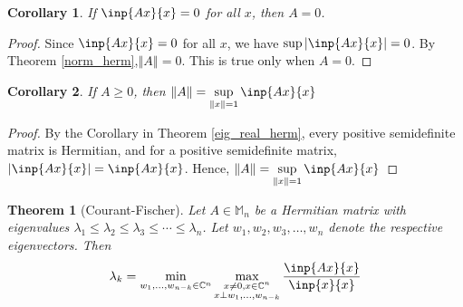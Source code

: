 \documentclass[twofold]{article}
\newcommand*\norm[1]{\left \Vert #1 \right\Vert}
\newcommand*\abs[1]{\left \vert #1 \right\vert}
\theoremstyle{plain}
\newtheorem{theorem}{Theorem}
\newtheorem*{corollary}{Corollary}
\theoremstyle{definition}
\theoremstyle{remark}
\begin{document}
\begin{corollary} If \(\inp{Ax}{x} = 0\) for all \(x\), then \(A = 0\).\end{corollary}
\begin{proof} Since \(\inp{Ax}{x} = 0\) for all \(x\), we have \(\sup \abs{\inp{Ax}{x}} = 0\). By Theorem \ref{norm_herm},\( \norm{A} = 0 \). This is true only when \(A = 0\).\end{proof}


\begin{corollary} If \(A \ge 0\), then \(\displaystyle \norm{A} = \sup _{\norm{x} = 1} \inp{Ax}{x}\) \end{corollary}
\begin{proof}   By the Corollary in Theorem \ref{eig_real_herm}, every positive semidefinite matrix is Hermitian, and for a positive semidefinite matrix, \(\abs{\inp{Ax}{x}} = \inp{Ax}{x}\). Hence, \(\norm{A} = \displaystyle \sup_{\norm{x} = 1} \inp{Ax}{x}\) \end{proof}



\begin{theorem}[Courant-Fischer] Let \(A \in \mathbb{M}_n\) be a Hermitian matrix with eigenvalues \(\lambda_1 \le \lambda_2 \le \lambda_3 \le \cdots \le \lambda_n\). Let \(w_1, w_2, w_3, \ldots , w_n\) denote the respective eigenvectors.  Then 
  \[ \lambda_k = \min_{w_1, \ldots , w_{n-k} \in \mathbb{C}^n} \max_{\substack{x \neq 0, x\in \mathbb{C}^n \\ x \perp w_1, \ldots , w_{n-k}}} \frac{\inp{Ax}{x}}{\inp{x}{x}}\]
 \end{theorem}
\end{document}
